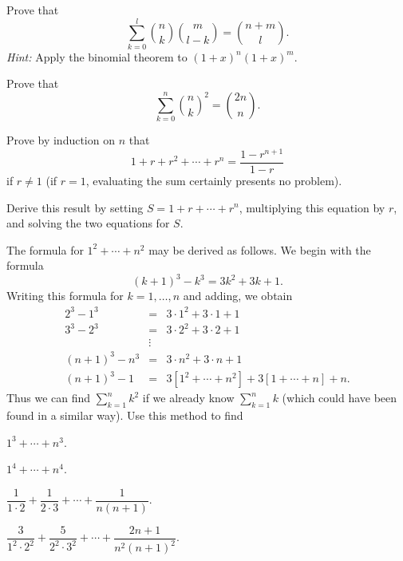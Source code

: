 \begin{letters}
\item Prove that
\[
\sum_{k=0}^{l} \binom{n}{k} \binom{m}{l-k} = \binom{n+m}{l}.
\]
\textit{Hint:} Apply the binomial theorem to $(1+x)^n(1+x)^m$.
\item Prove that
\[
\sum_{k=0}^{n} \binom{n}{k}^2 = \binom{2n}{n}.
\]
\end{letters}

\begin{letters}
\item Prove by induction on $n$ that
\[ 1 + r + r^2 + \cdots + r^n = \frac{1 - r^{n+1}}{1 - r} \]
if $r \neq 1$ (if $r = 1$, evaluating the sum certainly presents no problem).
\item Derive this result by setting $S = 1 + r + \cdots + r^n$, multiplying
  this equation by $r$, and solving the two equations for $S$.
\end{letters}

 The formula for $1^2 + \cdots + n^2$ may be derived as follows. We
begin with the formula
\[ (k+1)^3 - k^3 = 3k^2 + 3k + 1. \]
Writing this formula for $k = 1, \dots, n$ and adding, we obtain
\[
\begin{array}{rcl}
2^3 - 1^3 &=& 3 \cdot 1^2 + 3 \cdot 1 + 1\\
3^3 - 2^3 &=& 3 \cdot 2^2 + 3 \cdot 2 + 1\\
&\vdots\\
(n+1)^3 - n^3 &=& 3 \cdot n^2 + 3 \cdot n + 1\\
\hline
(n+1)^3 - 1 &=& 3[1^2 + \cdots + n^2] + 3[1 + \cdots + n] + n.
\end{array}
\]
Thus we can find $\sum_{k=1}^{n} k^2$ if we already know $\sum_{k=1}^{n} k$
(which could have been found in a similar way). Use this method to find
\begin{romans}
\item $1^3 + \cdots + n^3$.
\item $1^4 + \cdots + n^4$.
\item $\dfrac{1}{1\cdot 2} + \dfrac{1}{2\cdot 3} + \cdots + \dfrac{1}{n(n+1)}$.
\item $\dfrac{3}{1^2 \cdot 2^2} + \dfrac{5}{2^2 \cdot 3^2} + \cdots +
  \dfrac{2n+1}{n^2(n+1)^2}$.
\end{romans}

